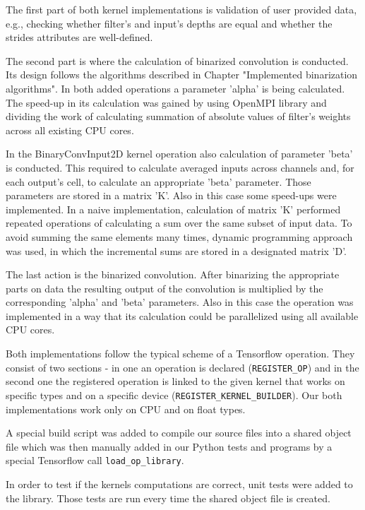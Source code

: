 \documentclass[licencjacka]{pracamgr}
\begin{document}
		The first part of both kernel implementations is validation of user provided data, e.g., checking whether filter's and input's depths are equal and whether the strides attributes are well-defined.
		
		The second part is where the calculation of binarized convolution is conducted. Its design follows the algorithms described in Chapter "Implemented binarization algorithms". In both added operations a parameter 'alpha' is being calculated. The speed-up in its calculation was gained by using OpenMPI library and dividing the work of calculating summation of absolute values of filter's weights across all existing CPU cores.

		In the BinaryConvInput2D kernel operation also calculation of parameter 'beta' is conducted. This required to calculate averaged inputs across channels and, for each output's cell, to calculate an appropriate 'beta' parameter. Those parameters are stored in a matrix 'K'. Also in this case some speed-ups were implemented. In a naive implementation, calculation of matrix 'K' performed repeated operations of calculating a sum over the same subset of input data. To avoid summing the same elements many times, dynamic programming approach was used, in which the incremental sums are stored in a designated matrix 'D'.
	
		The last action is the binarized convolution. After binarizing the appropriate parts on data the resulting output of the convolution is multiplied by the corresponding 'alpha' and 'beta' parameters. Also in this case the operation was implemented in a way that its calculation could be parallelized using all available CPU cores.

		Both implementations follow the typical scheme of a Tensorflow operation. They consist of two sections - in one an operation is declared (\texttt{REGISTER\_OP}) and in the second one the registered operation is linked to the given kernel that works on specific types and on a specific device (\texttt{REGISTER\_KERNEL\_BUILDER}). Our both implementations work only on CPU and on float types. 

		A special build script was added to compile our source files into a shared object file which was then manually added in our Python tests and programs by a special Tensorflow call \texttt{load\_op\_library}.

		In order to test if the kernels computations are correct, unit tests were added to the library. Those tests are run every time the shared object file is created.
	
\end{document}
